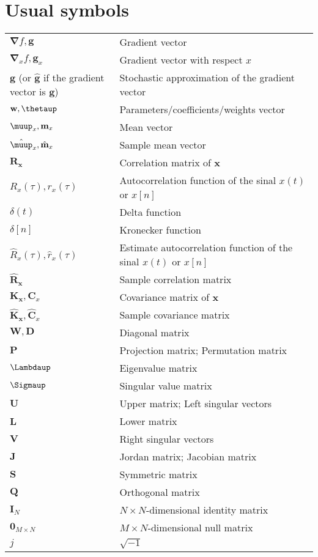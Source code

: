 \documentclass{article}
\begin{document}
\section{Usual symbols}
\begin{table}[H]
    \begin{tabularx}{\textwidth}{XX}
      \(\boldsymbol{\nabla}f, \mathbf{g}\) & Gradient vector \\
      \(\boldsymbol{\nabla}_{x}f, \mathbf{g}_{x}\) & Gradient vector with respect \(x\)\\
      \(\mathbf{g}\) (or \(\hat{\mathbf{g}}\) if the gradient vector is \(\mathbf{g}\)) & Stochastic approximation of the gradient vector \\
      \(\mathbf{w}, \boldsymbol{\thetaup}\) & Parameters/coefficients/weights vector \\
      \(\boldsymbol{\muup}_x, \mathbf{m}_x\) & Mean vector\\
      \(\hat{\boldsymbol{\muup}}_x, \hat{\mathbf{m}}_x\) & Sample mean vector\\
      \(\mathbf{R}_\mathbf{x}\) & Correlation matrix of \(\mathbf{x}\) \\
      \(R_x(\tau), r_x(\tau)\) & Autocorrelation function of the sinal \(x(t)\) or \(x[n]\)\\
      \(\delta(t)\) & Delta function\\
      \(\delta[n]\) & Kronecker function\\
      \(\hat{R}_x(\tau), \hat{r}_x(\tau)\) & Estimate autocorrelation function of the sinal \(x(t)\) or \(x[n]\)\\
      \(\hat{\mathbf{R}}_\mathbf{x}\) & Sample correlation matrix \\
      \(\mathbf{K}_\mathbf{x}, \mathbf{C}_x\) & Covariance matrix of \(\mathbf{x}\) \\
      \(\hat{\mathbf{K}}_\mathbf{x}, \hat{\mathbf{C}}_x\) & Sample covariance matrix \\
      \(\mathbf{W}, \mathbf{D}\) & Diagonal matrix \\
      \(\mathbf{P}\) & Projection matrix; Permutation matrix \\
      \(\boldsymbol{\Lambdaup}\) & Eigenvalue matrix \\
      \(\boldsymbol{\Sigmaup}\) & Singular value matrix\\
      \(\mathbf{U}\) & Upper matrix; Left singular vectors\\
      \(\mathbf{L}\) & Lower matrix\\
      \(\mathbf{V}\) & Right singular vectors\\
      \(\mathbf{J}\) & Jordan matrix; Jacobian matrix\\
      \(\mathbf{S}\) & Symmetric matrix\\
      \(\mathbf{Q}\) & Orthogonal matrix\\
      \(\mathbf{I}_N\) & \(N\times N\)-dimensional identity matrix\\
      \(\mathbf{0}_{M\times N}\) & \(M\times N\)-dimensional null matrix\\
      \(j\)& \(\sqrt{-1}\)
    \end{tabularx}
\end{table}
\end{document}
